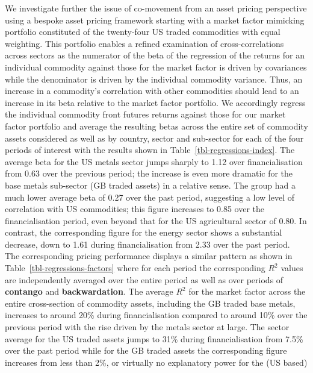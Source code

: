 \documentclass[
  authoryear,
  preprint,
  3p]{elsarticle}
\begin{document}
\medskip

We investigate further the issue of co-movement from an asset pricing
perspective using a bespoke asset pricing framework starting with a
market factor mimicking portfolio constituted of the twenty-four US
traded commodities with equal weighting. This portfolio enables a
refined examination of cross-correlations across sectors as the
numerator of the beta of the regression of the returns for an individual
commodity against those for the market factor is driven by covariances
while the denominator is driven by the individual commodity variance.
Thus, an increase in a commodity's correlation with other commodities
should lead to an increase in its beta relative to the market factor
portfolio. We accordingly regress the individual commodity front futures
returns against those for our market factor portfolio and average the
resulting betas across the entire set of commodity assets considered as
well as by country, sector and sub-sector for each of the four periods
of interest with the results shown in Table~\ref{tbl-regressions-index}.
The average beta for the US metals sector jumps sharply to 1.12 over
financialisation from 0.63 over the previous period; the increase is
even more dramatic for the base metals sub-sector (GB traded assets) in
a relative sense. The group had a much lower average beta of 0.27 over
the past period, suggesting a low level of correlation with US
commodities; this figure increases to 0.85 over the financialisation
period, even beyond that for the US agricultural sector of 0.80. In
contrast, the corresponding figure for the energy sector shows a
substantial decrease, down to 1.61 during financialisation from 2.33
over the past period.\\
The corresponding pricing performance displays a similar pattern as
shown in Table~\ref{tbl-regressions-factors} where for each period the
corresponding \(R^{2}\) values are independently averaged over the
entire period as well as over periods of \textbf{contango} and
\textbf{backwardation}. The average \(R^{2}\) for the market factor
across the entire cross-section of commodity assets, including the GB
traded base metals, increases to around 20\% during financialisation
compared to around 10\% over the previous period with the rise driven by
the metals sector at large. The sector average for the US traded assets
jumps to 31\% during financialisation from 7.5\% over the past period
while for the GB traded assets the corresponding figure increases from
less than 2\%, or virtually no explanatory power for the (US based)
\end{document}
